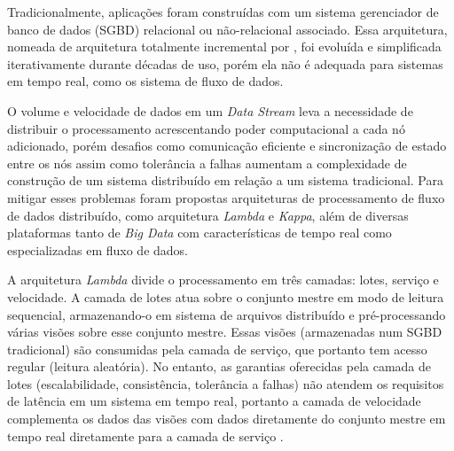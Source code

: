 


Tradicionalmente, aplicações foram construídas com um sistema gerenciador de
banco de dados (SGBD) relacional ou não-relacional associado. Essa arquitetura,
nomeada de arquitetura totalmente incremental por ,
foi evoluída e simplificada iterativamente durante décadas de uso, porém ela não
é adequada para sistemas em tempo real, como os sistema de fluxo de dados.

\newcommand{\lambdaa}{\xspace\emph{Lambda}\xspace}
\newcommand{\kappaa}{\xspace\emph{Kappa}\xspace}

O volume e velocidade de dados em um \emph{Data Stream} leva a necessidade de
distribuir o processamento acrescentando poder computacional a cada nó
adicionado, porém desafios como comunicação eficiente e sincronização de estado
entre os nós assim como tolerância a falhas aumentam a complexidade de
construção de um sistema distribuído em relação a um sistema tradicional.
Para mitigar esses problemas foram propostas arquiteturas de processamento de fluxo
de dados distribuído, como arquitetura \lambdaa e \kappaa, além de
diversas plataformas tanto de \emph{Big Data} com características de tempo real
como especializadas em fluxo de dados.

A arquitetura \lambdaa divide o processamento em três camadas: lotes, serviço
e velocidade. A camada de lotes atua sobre o conjunto mestre em modo de leitura
sequencial, armazenando-o em sistema de arquivos distribuído e pré-processando
várias visões sobre esse conjunto mestre. Essas visões (armazenadas num SGBD
tradicional) são consumidas pela camada de serviço, que portanto tem acesso
regular (leitura aleatória).
No entanto, as garantias oferecidas pela camada de
lotes (escalabilidade, consistência, tolerância a falhas) não atendem os requisitos
de latência em um sistema em tempo real, portanto a camada de velocidade
complementa os dados das visões com dados diretamente do conjunto mestre em
tempo real diretamente para a camada de serviço \cite{marz2015big}.


